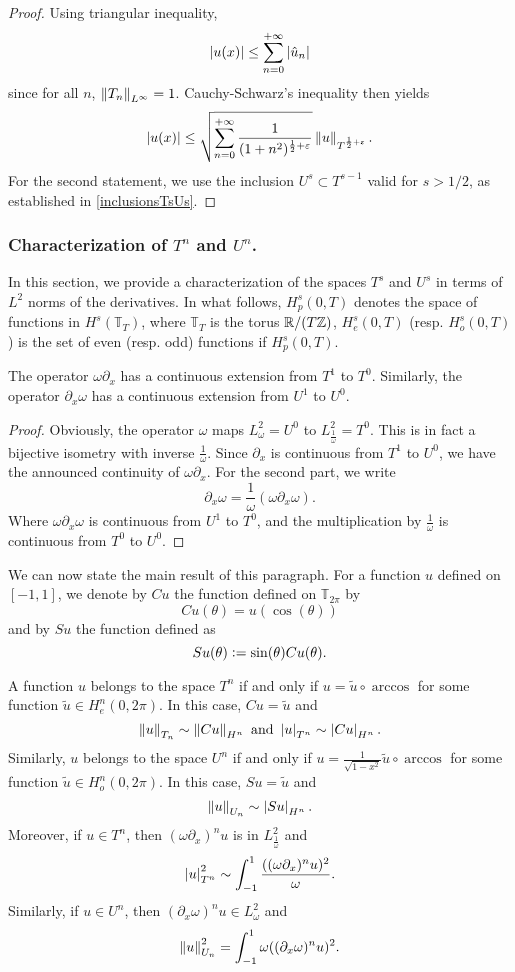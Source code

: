 \documentclass[a4paper]{article}
\begin{document}
\begin{proof}
	Using triangular inequality,
	\[\left\lvert u(x) \right\rvert \leq \sum_{n = 0}^{+ \infty} \left\lvert \hat{u}_n \right\rvert\]
	since for all $n$, $\left\|T_n\right\|_{L^\infty} = 1$. Cauchy-Schwarz's inequality then yields
	\[\left\lvert u(x) \right\rvert \leq \sqrt{\sum_{n= 0}^{+ \infty} \frac{1}{(1+ n^2)^{\frac{1}{2}+ \varepsilon}}} \left\|u\right\|_{T^{\frac{1}{2} + \varepsilon}}.\]
	For the second statement, we use the inclusion $U^{s} \subset T^{s-1}$ valid for $s > 1/2$, as established in \autoref{inclusionsTsUs}. 
\end{proof}	

\subsubsection{Characterization of $T^n$ and $U^n$.}
In this section, we provide a characterization of the spaces $T^s$ and $U^s$ in terms of $L^2$ norms of the derivatives. In what follows, $H^s_p(0,T)$ denotes the space of functions in $H^s(\mathbb{T}_{T})$, where $\mathbb{T}_T$ is the torus $\mathbb{R} / (T\mathbb{Z})$, $H^s_e(0,T)$ (resp. $H^s_o(0,T)$) is the set of even (resp. odd) functions if $H^s_p(0,T)$.
\begin{Lem}
	\label{omegadxetdxomga}
	The operator $\omega \partial_x$ has a continuous extension from $T^1$ to $T^0$. Similarly, the operator $\partial_x \omega$ has a continuous extension from $U^1$ to $U^0$. 
\end{Lem}
\begin{proof}
	Obviously, the operator $\omega$ maps $L^2_\omega = U^0$ to $L^2_\frac{1}{\omega} = T^0$. This is in fact a bijective isometry with inverse $\frac{1}{\omega}$.
	Since $\partial_x$ is continuous from $T^1$ to $U^0$, we have the announced continuity of $\omega \partial_x$.
	For the second part, we write 
	\[\partial_x \omega = \frac{1}{\omega} \left(\omega \partial_x \omega\right).\]
	Where $\omega \partial_x \omega$ is continuous from $U^1$ to $T^0$, and the multiplication by $\frac{1}{\omega}$ is continuous from $T^0$ to $U^0$. 
\end{proof}
We can now state the main result of this paragraph. For a function $u$ defined on $[-1,1]$, we denote by $Cu$ the function defined on $\mathbb{T}_{2\pi}$ by
\[ Cu(\theta) = u(\cos(\theta))\]
and by $Su$ the function defined as 
\[Su(\theta) \mathrel{\mathop:}= \sin(\theta) Cu(\theta).\]
\begin{Lem}
	A function $u$ belongs to the space $T^n$ if and only if $u = \tilde{u} \circ \arccos$ for some function $\tilde{u} \in H^n_e(0,2\pi)$. In this case, $Cu = \tilde{u}$ and
	\[ \left\|u\right\|_{T_n}\sim \left\|Cu\right\|_{H^n} \mbox{ and } \left\lvert u \right\rvert_{T^n} \sim \left\lvert Cu \right\rvert_{H^n}.\]
	Similarly, $u$ belongs to  the space $U^n$ if and only if $u = \frac{1}{\sqrt{1 - x^2}} \tilde{u}  \circ  \arccos$  for some function $\tilde{u} \in H^n_o(0,2\pi)$. In this case, $Su = \tilde{u}$ and
	\[\left\|u\right\|_{U_n} \sim \left\lvert Su \right\rvert_{H^n}.\]	
	Moreover, if $ u \in T^n$, then $(\omega \partial_x)^n u$ is in $L^2_\frac{1}{\omega}$ and 
	\[ \left\lvert u \right\rvert_{T^n}^2 \sim \int_{-1}^{1} \frac{((\omega \partial_x)^n u)^2}{\omega}.\]
	\noindent Similarly, if $u \in U^n$, then $(\partial_x \omega)^n u \in L^2_\omega$ and 
	\[ \left\|u\right\|_{U_n}^2 = \int_{-1}^{1}\omega ((\partial_x \omega)^n u)^2.\]
	\label{thmChar}
\end{Lem}
\end{document}

